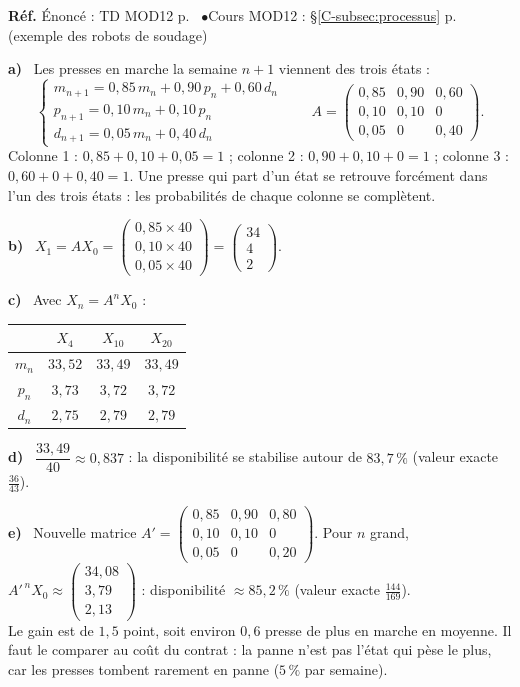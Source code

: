 \documentclass[a4paper,11pt]{article}
\newcommand{\M}[1]{\begin{pmatrix}#1\end{pmatrix}}
\newcommand{\cours}[1]{§\ref{C-#1} p.~\pageref{C-#1}}
\newcommand{\source}[2]{{\footnotesize\color{uimmgray}\textbf{Réf.} \enspace Énoncé : TD MOD12 p.~\pageref{T-#1} \enspace$\bullet$\enspace Cours MOD12 : #2}\par\smallskip}
\newcommand{\q}[1]{\textbf{\color{uimmblue}#1}\ }
\begin{document}
\begin{correction}
\source{exo:9}{\cours{subsec:processus} (exemple des robots de soudage)}
\q{a)} Les presses en marche la semaine $n+1$ viennent des trois états :
\[
\left\{\begin{array}{l}
m_{n+1} = 0{,}85\,m_n + 0{,}90\,p_n + 0{,}60\,d_n\\
p_{n+1} = 0{,}10\,m_n + 0{,}10\,p_n\\
d_{n+1} = 0{,}05\,m_n + 0{,}40\,d_n
\end{array}\right.
\qquad
A = \M{0{,}85 & 0{,}90 & 0{,}60\\ 0{,}10 & 0{,}10 & 0\\ 0{,}05 & 0 & 0{,}40}.
\]
Colonne 1 : $0{,}85 + 0{,}10 + 0{,}05 = 1$ ; colonne 2 : $0{,}90 + 0{,}10 + 0 = 1$ ; colonne 3 : $0{,}60 + 0 + 0{,}40 = 1$. Une presse qui part d'un état se retrouve forcément dans l'un des trois états : les probabilités de chaque colonne se complètent.

\q{b)} $X_1 = AX_0 = \M{0{,}85\times 40\\ 0{,}10\times 40\\ 0{,}05\times 40} = \M{34\\4\\2}$.

\q{c)} Avec $X_n = A^nX_0$ :
\begin{center}
\renewcommand{\arraystretch}{1.3}
\begin{tabular}{|c|c|c|c|}
\hline
\rowcolor{uimmlightblue}
 & $X_4$ & $X_{10}$ & $X_{20}$ \\
\hline
$m_n$ & $33{,}52$ & $33{,}49$ & $33{,}49$ \\
$p_n$ & $3{,}73$ & $3{,}72$ & $3{,}72$ \\
$d_n$ & $2{,}75$ & $2{,}79$ & $2{,}79$ \\
\hline
\end{tabular}
\end{center}

\q{d)} $\dfrac{33{,}49}{40}\approx 0{,}837$ : la disponibilité se stabilise autour de $83{,}7\,\%$ (valeur exacte $\frac{36}{43}$).

\q{e)} Nouvelle matrice $A' = \M{0{,}85 & 0{,}90 & 0{,}80\\ 0{,}10 & 0{,}10 & 0\\ 0{,}05 & 0 & 0{,}20}$. Pour $n$ grand, $A'^{\,n}X_0\approx\M{34{,}08\\ 3{,}79\\ 2{,}13}$ : disponibilité $\approx 85{,}2\,\%$ (valeur exacte $\frac{144}{169}$).\\
Le gain est de $1{,}5$ point, soit environ $0{,}6$ presse de plus en marche en moyenne. Il faut le comparer au coût du contrat : la panne n'est pas l'état qui pèse le plus, car les presses tombent rarement en panne ($5\,\%$ par semaine).
\end{correction}
\end{document}
